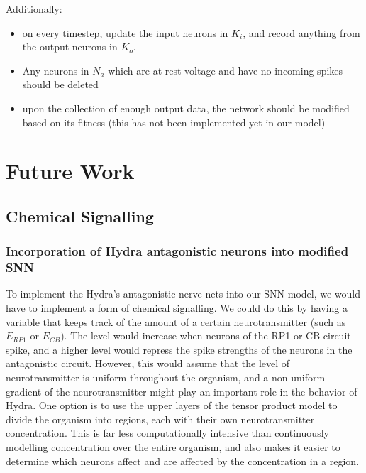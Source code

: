 \documentclass{article}
\begin{document}
Additionally:
\begin{itemize}
    \item on every timestep, update the input neurons in $K_i$, and record anything from the output neurons in $K_o$. 
    \item Any neurons in $N_a$ which are at rest voltage and have no incoming spikes should be deleted
    \item upon the collection of enough output data, the network should be modified based on its fitness (this has not been implemented yet in our model)
\end{itemize}

\newpage

\section{Future Work}


\subsection{Chemical Signalling}

\subsubsection{Incorporation of Hydra antagonistic neurons into modified SNN} \label{hydra_ant_SNN}

To implement the Hydra's antagonistic nerve nets into our SNN model, we would have to implement a form of chemical signalling. We could do this by having a variable that keeps track of the amount of a certain neurotransmitter (such as $E_{RP1}$ or $E_{CB}$). The level would increase when neurons of the RP1 or CB circuit spike, and a higher level would repress the spike strengths of the neurons in the antagonistic circuit. However, this would assume that the level of neurotransmitter is uniform throughout the organism, and a non-uniform gradient of the neurotransmitter might play an important role in the behavior of Hydra. One option is to use the upper layers of the tensor product model to divide the organism into regions, each with their own neurotransmitter concentration. This is far less computationally intensive than continuously modelling concentration over the entire organism, and also makes it easier to determine which neurons affect and are affected by the concentration in a region.
\end{document}
